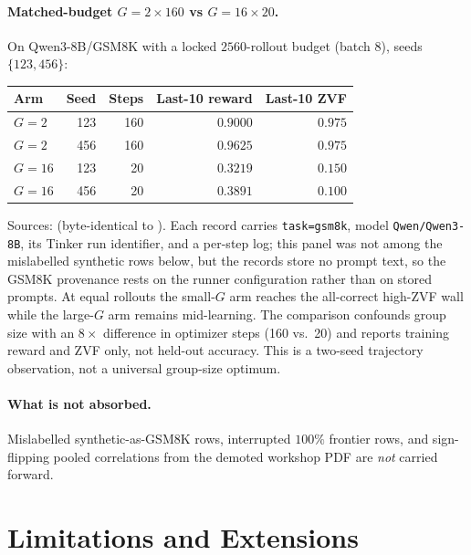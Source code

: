\documentclass[11pt]{article}
\newcommand{\zvf}{\textnormal{ZVF}}
\begin{document}
\paragraph{Matched-budget $G{=}2\times 160$ vs $G{=}16\times 20$.}
On Qwen3-8B/GSM8K with a locked $2560$-rollout budget (batch $8$), seeds
$\{123,456\}$:
\begin{center}
\small
\begin{tabular}{@{}lrrrr@{}}
\toprule
Arm & Seed & Steps & Last-10 reward & Last-10 ZVF \\
\midrule
$G{=}2$  & 123 & 160 & $0.9000$ & $0.975$ \\
$G{=}2$  & 456 & 160 & $0.9625$ & $0.975$ \\
$G{=}16$ & 123 & 20  & $0.3219$ & $0.150$ \\
$G{=}16$ & 456 & 20  & $0.3891$ & $0.100$ \\
\bottomrule
\end{tabular}
\end{center}
Sources:
(byte-identical to
). Each
record carries \texttt{task=gsm8k}, model \texttt{Qwen/Qwen3-8B}, its Tinker run
identifier, and a per-step log; this panel was not among the mislabelled
synthetic rows below, but the records store no prompt text, so the GSM8K
provenance rests on the runner configuration rather than on stored prompts.
At equal rollouts the small-$G$ arm reaches the all-correct high-\zvf{} wall
while the large-$G$ arm remains mid-learning. The comparison confounds group
size with an $8\times$ difference in optimizer steps (160 vs.\ 20) and reports
training reward and \zvf{} only, not held-out accuracy. This is a two-seed
trajectory observation, not a universal group-size optimum.

\paragraph{What is not absorbed.}
Mislabelled synthetic-as-GSM8K rows, interrupted $100\%$ frontier rows, and
sign-flipping pooled correlations from the demoted workshop PDF are
\emph{not} carried forward.

\section{Limitations and Extensions}
\label{sec:limits}
\end{document}
